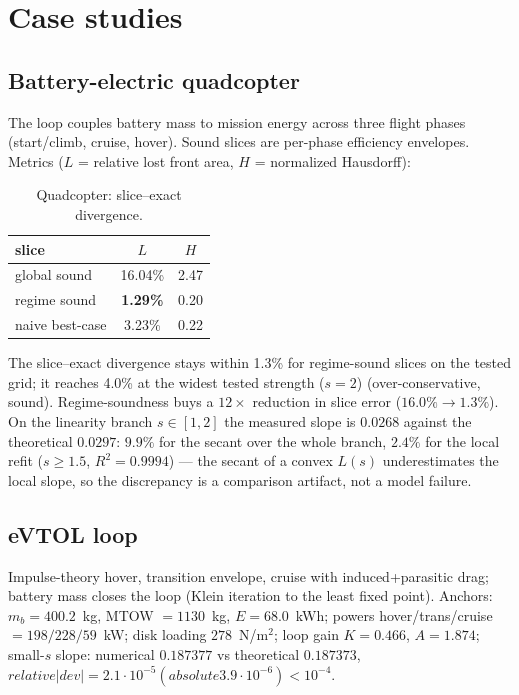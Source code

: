 \documentclass[11pt]{article}
\numberwithin{equation}{section}
\begin{document}
\section{Case studies}\label{sec:cases}

\subsection{Battery-electric quadcopter}
The loop couples battery mass to mission energy across three flight phases
(start/climb, cruise, hover). Sound slices are per-phase efficiency envelopes.
Metrics ($L$ = relative lost front area, $H$ = normalized Hausdorff):

\begin{table}[h]
\centering
\small
\begin{tabular}{lcc}
\toprule
slice & $L$ & $H$ \\
\midrule
global sound  & 16.04\% & 2.47 \\
regime sound  & \textbf{1.29\%} & 0.20 \\
naive best-case & 3.23\% & 0.22 \\
\bottomrule
\end{tabular}
\caption{Quadcopter: slice--exact divergence.}
\label{tab:quad}
\end{table}

The slice--exact divergence stays within 1.3\% for regime-sound slices on the
tested grid; it reaches 4.0\% at the widest tested strength ($s=2$)
(over-conservative, sound). Regime-soundness buys a $12\times$ reduction in
slice error ($16.0\%\to1.3\%$). On the linearity branch $s\in[1,2]$ the
measured slope is $0.0268$ against the theoretical $0.0297$: $9.9\%$ for the
secant over the whole branch, $2.4\%$ for the local refit ($s\ge1.5$,
$R^2=0.9994$) --- the secant of a convex $L(s)$ underestimates the local
slope, so the discrepancy is a comparison artifact, not a model failure.

\subsection{eVTOL loop}
Impulse-theory hover, transition envelope, cruise with induced+parasitic drag;
battery mass closes the loop (Klein iteration to the least fixed point).
Anchors: $m_b=400.2$~kg, MTOW $=1130$~kg, $E=68.0$~kWh; powers
hover/trans/cruise $=198/228/59$~kW; disk loading $278$~N/m$^2$;
loop gain $K=0.466$, $A=1.874$; small-$s$ slope: numerical $0.187377$ vs
theoretical $0.187373$, $relative |dev| = 2.1\cdot10^{-5} (absolute 3.9\cdot10^{-6}) < 10^{-4}$.
\end{document}
